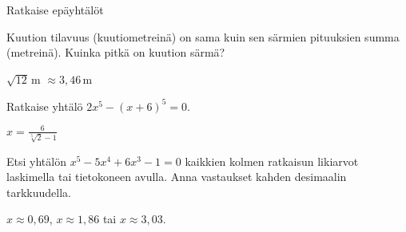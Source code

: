 \begin{tehtava} 
Ratkaise epäyhtälöt
     \begin{vastaus}
    \end{vastaus}
\end{tehtava}

\begin{tehtava} 
Kuution tilavuus (kuutiometreinä) on sama kuin sen särmien pituuksien summa (metreinä). Kuinka pitkä on kuution särmä?
    \begin{vastaus}
		$\sqrt{12}$\,m $\approx 3,46$\,m
    \end{vastaus}
\end{tehtava}

\begin{tehtava} 
Ratkaise yhtälö $2x^5-(x+6)^5=0$.
    \begin{vastaus}
	$x=\frac{6}{\sqrt[5]{2}-1}$
    \end{vastaus}
\end{tehtava}

\begin{tehtava}
Etsi yhtälön $x^5-5x^4+6x^3-1=0$ kaikkien kolmen ratkaisun likiarvot laskimella tai tietokoneen avulla. Anna vastaukset kahden desimaalin tarkkuudella.
    \begin{vastaus}
	$x \approx 0,69$, $x \approx 1,86$ tai $x \approx 3,03$.
    \end{vastaus}
\end{tehtava}
